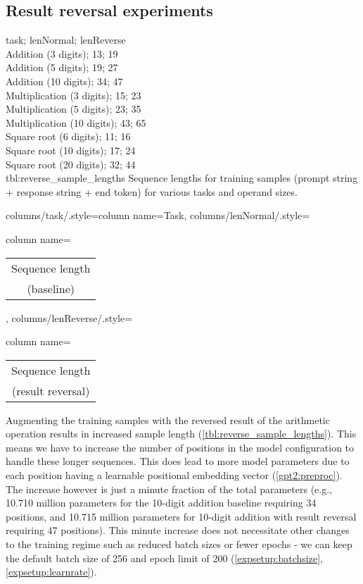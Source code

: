 \subsection{Result reversal experiments}
{
	task; lenNormal; lenReverse\\
	Addition (3 digits); 13; 19 \\
	Addition (5 digits); 19; 27 \\
	Addition (10 digits); 34; 47 \\
	Multiplication (3 digits); 15; 23 \\
	Multiplication (5 digits); 23; 35 \\
	Multiplication (10 digits); 43; 65 \\
	Square root (6 digits); 11; 16 \\
	Square root (10 digits); 17; 24 \\
	Square root (20 digits); 32; 44 \\
}
{tbl:reverse_sample_lengths}
{
	Sequence lengths for training samples (prompt string + response string + end token) for various tasks and operand sizes.
}
{%
	columns/task/.style={column name={Task}},
	columns/lenNormal/.style={column name={\begin{tabular}{c} Sequence length \\ (baseline) \\ \end{tabular}}},
	columns/lenReverse/.style={column name={\begin{tabular}{c} Sequence length \\ (result reversal) \\ \end{tabular}}}
}

Augmenting the training samples with the reversed result of the arithmetic operation results in increased sample length (\cref{tbl:reverse_sample_lengths}).
This means we have to increase the number of positions in the model configuration to handle these longer sequences. This does lead to more model parameters due to each position having a learnable positional embedding vector (\cref{gpt2:preproc}). The increase however is just a minute fraction of the total parameters (e.g., 10.710 million parameters for the 10-digit addition baseline requiring 34 positions, and 10.715 million parameters for 10-digit addition with result reversal requiring 47 positions). This minute increase does not necessitate other changes to the training regime such as reduced batch sizes or fewer epochs - we can keep the default batch size of 256 and epoch limit of 200 (\cref{expsetup:batchsize}, \cref{expsetup:learnrate}).




